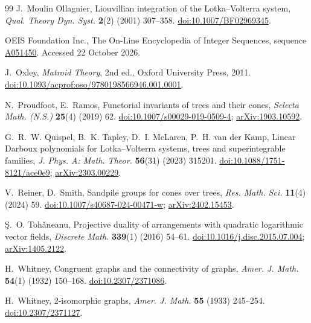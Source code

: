 \documentclass[11pt,a4paper]{article}
\theoremstyle{definition}
\theoremstyle{remark}
\begin{document}
\begin{thebibliography}{99}
 J.~Moulin Ollagnier, Liouvillian integration of the Lotka--Volterra system, \emph{Qual. Theory Dyn. Syst.} \textbf{2}(2) (2001) 307--358. \href{https://doi.org/10.1007/BF02969345}{doi:10.1007/BF02969345}.

 OEIS Foundation Inc., The On-Line Encyclopedia of Integer Sequences, sequence \href{https://oeis.org/A051450}{A051450}. Accessed 22 October 2026.

 J.~Oxley, \emph{Matroid Theory}, 2nd ed., Oxford University Press, 2011. \href{https://doi.org/10.1093/acprof:oso/9780198566946.001.0001}{doi:10.1093/acprof:oso/9780198566946.001.0001}.

 N.~Proudfoot, E.~Ramos, Functorial invariants of trees and their cones, \emph{Selecta Math. (N.S.)} \textbf{25}(4) (2019) 62. \href{https://doi.org/10.1007/s00029-019-0509-4}{doi:10.1007/s00029-019-0509-4}; \href{https://arxiv.org/abs/1903.10592}{arXiv:1903.10592}.

 G.~R.~W. Quispel, B.~K. Tapley, D.~I. McLaren, P.~H. van der Kamp, Linear Darboux polynomials for Lotka--Volterra systems, trees and superintegrable families, \emph{J. Phys. A: Math. Theor.} \textbf{56}(31) (2023) 315201. \href{https://doi.org/10.1088/1751-8121/ace0e9}{doi:10.1088/1751-8121/ace0e9}; \href{https://arxiv.org/abs/2303.00229}{arXiv:2303.00229}.

 V.~Reiner, D.~Smith, Sandpile groups for cones over trees, \emph{Res. Math. Sci.} \textbf{11}(4) (2024) 59. \href{https://doi.org/10.1007/s40687-024-00471-w}{doi:10.1007/s40687-024-00471-w}; \href{https://arxiv.org/abs/2402.15453}{arXiv:2402.15453}.

 \c{S}.~O. Toh\v{a}neanu, Projective duality of arrangements with quadratic logarithmic vector fields, \emph{Discrete Math.} \textbf{339}(1) (2016) 54--61. \href{https://doi.org/10.1016/j.disc.2015.07.004}{doi:10.1016/j.disc.2015.07.004}; \href{https://arxiv.org/abs/1405.2122}{arXiv:1405.2122}.

 H.~Whitney, Congruent graphs and the connectivity of graphs, \emph{Amer. J. Math.} \textbf{54}(1) (1932) 150--168. \href{https://doi.org/10.2307/2371086}{doi:10.2307/2371086}.

 H.~Whitney, 2-isomorphic graphs, \emph{Amer. J. Math.} \textbf{55} (1933) 245--254. \href{https://doi.org/10.2307/2371127}{doi:10.2307/2371127}.

\end{thebibliography}
\end{document}
